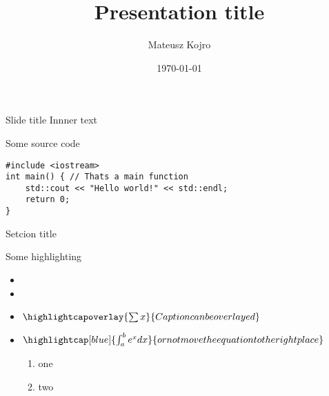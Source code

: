 \documentclass{beamer}
\title{Presentation title}
\author{Mateusz Kojro}
\date{\today}
\begin{document}
    \begin{frame}[plain]
        \maketitle
    \end{frame}

    
    \begin{frame}{Slide title}
        Innner text
    \end{frame}

    \begin{frame}[fragile]{Some source code}
            \begin{verbatim}
#include <iostream>
int main() { // Thats a main function
    std::cout << "Hello world!" << std::endl;    
    return 0;
}
            \end{verbatim}
    \end{frame}

    \begin{frame}[plain,c]
        \begin{center}
            \Large Setcion title
        \end{center}
    \end{frame}

    \begin{frame}{Some highlighting}

        \begin{itemize}

            \item{}
            \item{}
            \item{$\highlightcapoverlay{\sum{x}}{Caption can be overlayed}$}
            \item{$\highlightcap[blue]{\int_a^b e^x dx}{or not move the equation to the right place}$}

            \begin{enumerate}
                \item{one}
                \item{two}
            \end{enumerate}
        \end{itemize}

    \end{frame}
\end{document}
